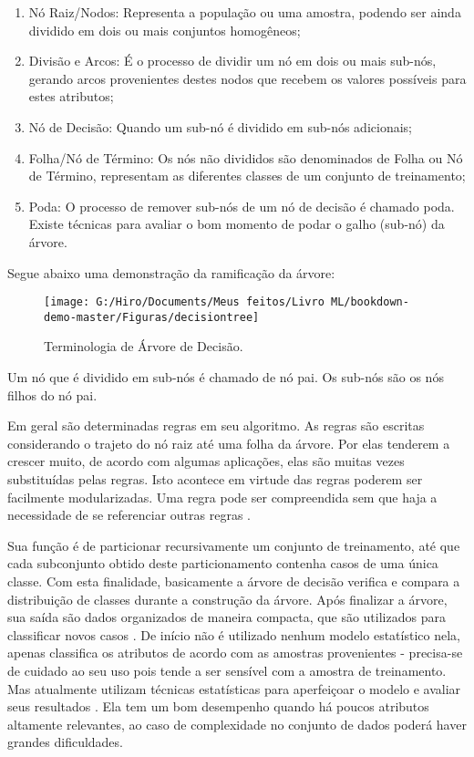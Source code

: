 \documentclass[
]{book}
\begin{document}
\begin{enumerate}
\def\labelenumi{\arabic{enumi}.}
\item
  Nó Raiz/Nodos: Representa a população ou uma amostra, podendo ser ainda dividido em dois ou mais conjuntos homogêneos;
\item
  Divisão e Arcos: É o processo de dividir um nó em dois ou mais sub-nós, gerando arcos provenientes destes nodos que recebem os valores possíveis para estes atributos;
\item
  Nó de Decisão: Quando um sub-nó é dividido em sub-nós adicionais;
\item
  Folha/Nó de Término: Os nós não divididos são denominados de Folha ou Nó de Término, representam as diferentes classes de um conjunto de treinamento;
\item
  Poda: O processo de remover sub-nós de um nó de decisão é chamado poda. Existe técnicas para avaliar o bom momento de podar o galho (sub-nó) da árvore.
\end{enumerate}

Segue abaixo uma demonstração da ramificação da árvore:

\begin{figure}

{\centering \texttt{[image: G:/Hiro/Documents/Meus feitos/Livro ML/bookdown-demo-master/Figuras/decisiontree]} 

}

\caption{Terminologia de Árvore de Decisão.}\label{fig:decisiontree}
\end{figure}



Um nó que é dividido em sub-nós é chamado de nó pai. Os sub-nós são os nós filhos do nó pai.

Em geral são determinadas regras em seu algoritmo. As regras são escritas considerando o trajeto do nó raiz até uma folha da árvore. Por elas tenderem a crescer muito, de acordo com algumas aplicações, elas são muitas vezes substituídas pelas regras. Isto acontece em virtude das regras poderem ser facilmente modularizadas. Uma regra pode ser compreendida sem que haja a necessidade de se referenciar outras regras \citep{ingargiola1996building}.

Sua função é de particionar recursivamente um conjunto de treinamento, até que cada subconjunto obtido deste particionamento contenha casos de uma única classe. Com esta finalidade, basicamente a árvore de decisão verifica e compara a distribuição de classes durante a construção da árvore. Após finalizar a árvore, sua saída são dados organizados de maneira compacta, que são utilizados para classificar novos casos \citep{holsheimer1994data}. De início não é utilizado nenhum modelo estatístico nela, apenas classifica os atributos de acordo com as amostras provenientes - precisa-se de cuidado ao seu uso pois tende a ser sensível com a amostra de treinamento. Mas atualmente utilizam técnicas estatísticas para aperfeiçoar o modelo e avaliar seus resultados \citep{shiba2005classificaccao}. Ela tem um bom desempenho quando há poucos atributos altamente relevantes, ao caso de complexidade no conjunto de dados poderá haver grandes dificuldades.
\end{document}
